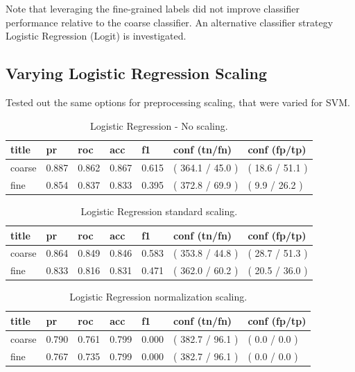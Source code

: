 \documentclass[ms]{nuthesis}
\begin{document}
\par Note that leveraging the fine-grained labels did not improve classifier performance
relative to the coarse classifier. An alternative classifier strategy Logistic Regression
 (Logit) is investigated.


\subsection{Varying Logistic Regression Scaling}
\par Tested out the same options for preprocessing scaling, that were varied for SVM.

\FloatBarrier
\begin{table}[H]
\centering
\caption{Logistic Regression - No scaling.}
\label{tab:LogRegDef}
\begin{tabular}{|l||l||l||l||l||l||l|}\toprule
title & pr & roc & acc & f1 & conf (tn/fn) & conf (fp/tp) \\ \midrule
coarse & 0.887 & 0.862 & 0.867 & 0.615 & ( 364.1 / 45.0 ) & ( 18.6 / 51.1 ) \\
fine & 0.854 & 0.837 & 0.833 & 0.395 & ( 372.8 / 69.9 ) & ( 9.9 / 26.2 ) \\ \bottomrule
\end{tabular}
\end{table}
\FloatBarrier

\FloatBarrier
\begin{table}[H]
\centering
\caption{Logistic Regression standard scaling.}
\label{tab:LogRegStandard}
\begin{tabular}{|l||l||l||l||l||l||l|}\toprule
title & pr & roc & acc & f1 & conf (tn/fn) & conf (fp/tp) \\ \midrule
coarse & 0.864 & 0.849 & 0.846 & 0.583 & ( 353.8 / 44.8 ) & ( 28.7 / 51.3 ) \\
fine & 0.833 & 0.816 & 0.831 & 0.471 & ( 362.0 / 60.2 ) & ( 20.5 / 36.0 ) \\ \bottomrule
\end{tabular}
\end{table}
\FloatBarrier

\FloatBarrier
\begin{table}[H]
\centering
\caption{Logistic Regression normalization scaling.}
\label{tab:LogRegNorm}
\begin{tabular}{|l||l||l||l||l||l||l|}\toprule
title & pr & roc & acc & f1 & conf (tn/fn) & conf (fp/tp) \\ \midrule
coarse & 0.790 & 0.761 & 0.799 & 0.000 & ( 382.7 / 96.1 ) & ( 0.0 / 0.0 ) \\
fine & 0.767 & 0.735 & 0.799 & 0.000 & ( 382.7 / 96.1 ) & ( 0.0 / 0.0 ) \\ \bottomrule
\end{tabular}
\end{table}
\FloatBarrier
\end{document}

